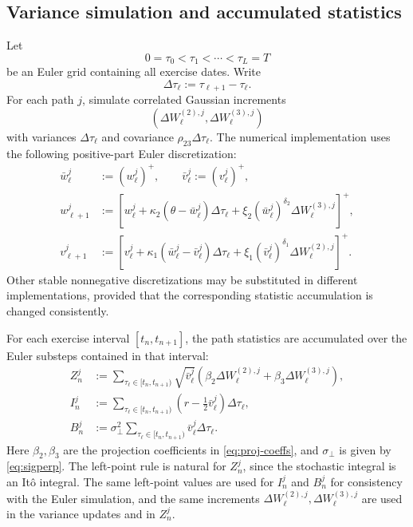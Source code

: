 \documentclass[pdflatex,sn-mathphys-num]{sn-jnl}
\theoremstyle{thmstyleone}%
\theoremstyle{thmstylethree}%
\theoremstyle{thmstyletwo}%
\begin{document}
\subsection{Variance simulation and accumulated statistics}
Let
\[
    0=\tau_0<\tau_1<\cdots<\tau_L=T
\]
be an Euler grid containing all exercise dates. Write
\[
    \Delta\tau_\ell:=\tau_{\ell+1}-\tau_\ell.
\]
For each path $j$, simulate correlated Gaussian increments
\[
    (\Delta W_{\ell}^{(2),j},\Delta W_{\ell}^{(3),j})
\]
with variances $\Delta\tau_\ell$ and covariance
$\rho_{23}\Delta\tau_\ell$. The numerical implementation uses the following
positive-part Euler discretization:
\[
\begin{aligned}
    \bar w_\ell^j&:=(w_\ell^j)^+,
    \qquad
    \bar v_\ell^j:=(v_\ell^j)^+,\\
    w_{\ell+1}^j
    &:=
    \left[
        w_\ell^j+\kappa_2(\theta-\bar w_\ell^j)\Delta\tau_\ell
        +\xi_2(\bar w_\ell^j)^{\delta_2}\Delta W_{\ell}^{(3),j}
    \right]^+,\\
    v_{\ell+1}^j
    &:=
    \left[
        v_\ell^j+\kappa_1(\bar w_\ell^j-\bar v_\ell^j)\Delta\tau_\ell
        +\xi_1(\bar v_\ell^j)^{\delta_1}\Delta W_{\ell}^{(2),j}
    \right]^+.
\end{aligned}
\]
Other stable nonnegative discretizations may be substituted in different
implementations, provided that the corresponding statistic accumulation is
changed consistently.

For each exercise interval $[t_n,t_{n+1}]$, the path statistics are accumulated
over the Euler substeps contained in that interval:
\[
\begin{aligned}
    Z_n^j
    &:=
    \sum_{\tau_\ell\in[t_n,t_{n+1})}
        \sqrt{\bar v_\ell^j}
        \left(
            \beta_2\Delta W_{\ell}^{(2),j}
            +
            \beta_3\Delta W_{\ell}^{(3),j}
        \right),\\
    I_n^j
    &:=
    \sum_{\tau_\ell\in[t_n,t_{n+1})}
        \left(r-\frac12\bar v_\ell^j\right)\Delta\tau_\ell,\\
    B_n^j
    &:=
    \sigma_\perp^2
    \sum_{\tau_\ell\in[t_n,t_{n+1})}
        \bar v_\ell^j\Delta\tau_\ell .
\end{aligned}
\]
Here $\beta_2,\beta_3$ are the projection coefficients in
\eqref{eq:proj-coeffs}, and $\sigma_\perp$ is given by \eqref{eq:sigperp}.
The left-point rule is natural for $Z_n^j$, since the stochastic integral is an
It\^{o} integral. The same left-point values are used for $I_n^j$ and $B_n^j$ for
consistency with the Euler simulation, and the same increments
$\Delta W_{\ell}^{(2),j},\Delta W_{\ell}^{(3),j}$ are used in the variance
updates and in $Z_n^j$.
\end{document}

